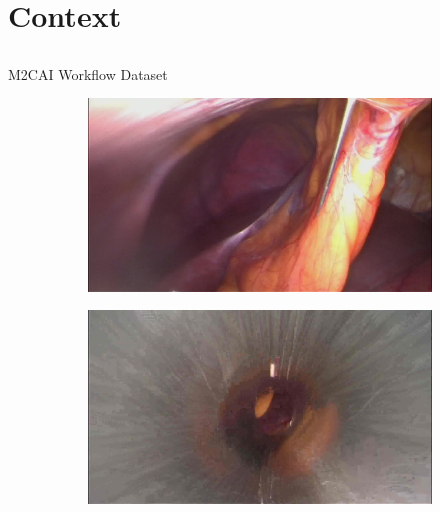 \section{Context} \subsection{}\label{}

\begin{frame}{M2CAI Workflow Dataset}
	
		\begin{figure}
		\centering
		\begin{subfigure}{.49\textwidth}
			\centering
			\includegraphics[width=.90\linewidth]{images/m2cai.jpg}
			\label{fig:dsg1}
		\end{subfigure}%
		\begin{subfigure}{.49\textwidth}
			\centering
			\includegraphics[width=.90\linewidth]{images/m2cai-2.jpg}
			\label{fig:dsg2}
		\end{subfigure}
		\label{fig:dsgimages}
	\end{figure}
	

\end{frame}
